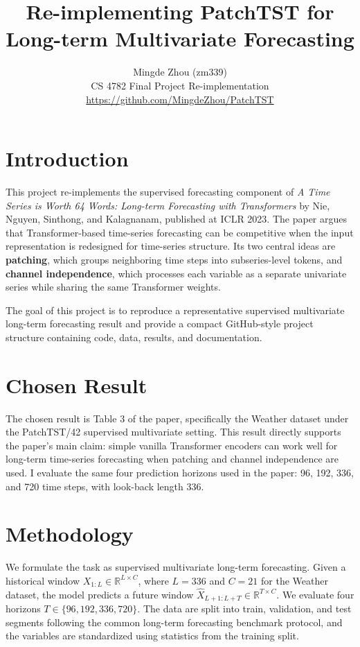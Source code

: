 \documentclass[11pt]{article}
\title{\vspace{-1.2em}\textbf{Re-implementing PatchTST for Long-term Multivariate Forecasting}}
\author{Mingde Zhou (zm339) \\ CS 4782 Final Project Re-implementation \\ \href{https://github.com/MingdeZhou/PatchTST}{https://github.com/MingdeZhou/PatchTST}}
\date{}
\begin{document}
\maketitle
\vspace{-1.4em}

\section{Introduction}

This project re-implements the supervised forecasting component of \textit{A Time Series is Worth 64 Words: Long-term Forecasting with Transformers} by Nie, Nguyen, Sinthong, and Kalagnanam, published at ICLR 2023. The paper argues that Transformer-based time-series forecasting can be competitive when the input representation is redesigned for time-series structure. Its two central ideas are \textbf{patching}, which groups neighboring time steps into subseries-level tokens, and \textbf{channel independence}, which processes each variable as a separate univariate series while sharing the same Transformer weights.

The goal of this project is to reproduce a representative supervised multivariate long-term forecasting result and provide a compact GitHub-style project structure containing code, data, results, and documentation.

\section{Chosen Result}

The chosen result is Table 3 of the paper, specifically the Weather dataset under the PatchTST/42 supervised multivariate setting. This result directly supports the paper's main claim: simple vanilla Transformer encoders can work well for long-term time-series forecasting when patching and channel independence are used. I evaluate the same four prediction horizons used in the paper: 96, 192, 336, and 720 time steps, with look-back length 336.

\section{Methodology}

We formulate the task as supervised multivariate long-term forecasting. Given a historical window \(X_{1:L} \in \mathbb{R}^{L \times C}\), where \(L=336\) and \(C=21\) for the Weather dataset, the model predicts a future window \(\hat{X}_{L+1:L+T} \in \mathbb{R}^{T \times C}\). We evaluate four horizons \(T \in \{96, 192, 336, 720\}\). The data are split into train, validation, and test segments following the common long-term forecasting benchmark protocol, and the variables are standardized using statistics from the training split.
\end{document}
